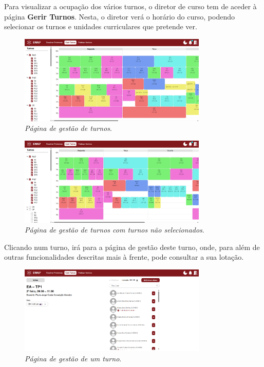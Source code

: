\documentclass[12pt, a4paper]{article}
\begin{document}
Para visualizar a ocupação dos vários turnos, o diretor de curso tem de aceder à página
\textbf{Gerir Turnos}. Nesta, o diretor verá o horário do curso, podendo selecionar os
turnos e unidades curriculares que pretende ver.

\begin{figure}[H]
    \centering
    \includegraphics[width=0.8\textwidth]{res/manual/gerir_turnos.png}
    \caption{\emph{Página de gestão de turnos}.}
    \label{gerir_turnos}
\end{figure}

\begin{figure}[H]
    \centering
    \includegraphics[width=0.8\textwidth]{res/manual/gerir_turnos_filtrados.png}
    \caption{\emph{Página de gestão de turnos com turnos não selecionados}.}
    \label{gerir_turnos_filtrados}
\end{figure}

Clicando num turno, irá para a página de gestão deste turno, onde, para além de outras
funcionalidades descritas mais à frente, pode consultar a sua lotação.

\begin{figure}[H]
    \centering
    \includegraphics[width=0.8\textwidth]{res/manual/gerir_turno.png}
    \caption{\emph{Página de gestão de um turno}.}
    \label{gerir_turno}
\end{figure}
\end{document}
